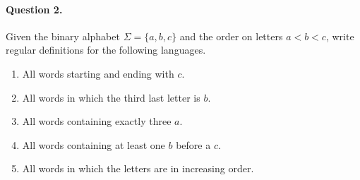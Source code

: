 \paragraph{Question 2.} Given the binary alphabet \(\Sigma = \{a, b,
c\}\) and the order on letters \(a < b < c\), write regular
definitions for the following languages.
\begin{enumerate}

  \item All words starting and ending with \(c\).

  \item All words in which the third last letter is \(b\).

  \item All words containing exactly three \(a\).

  \item All words containing at least one \(b\) before a \(c\).

  \item All words in which the letters are in increasing order.

\end{enumerate}
